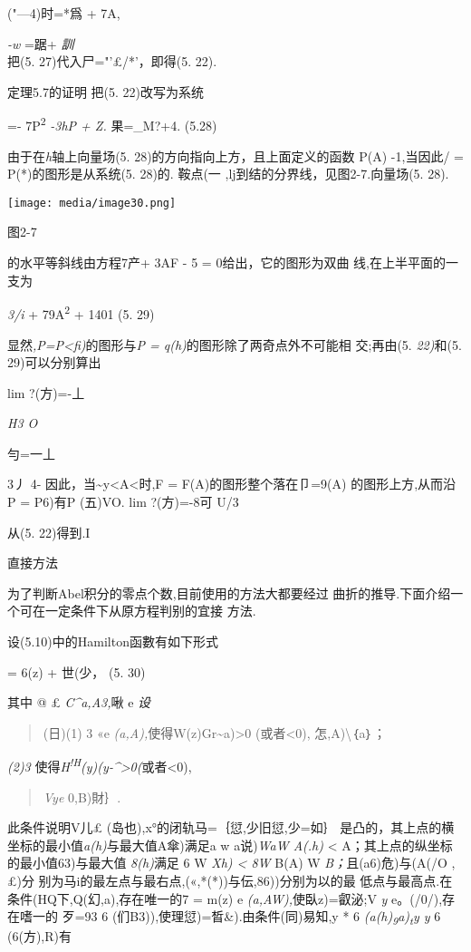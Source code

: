 \documentclass{article}
\begin{document}
("---4)时=*爲 + 7A,

\emph{-w} =踞+ \emph{訓\\
}把(5. 27)代入尸="'£/*'，即得(5. 22). \textbar{}

定理5.7的证明 把(5. 22)改写为系统

=- 7P\textsuperscript{2} \emph{-3hP + Z.} 果=\_M?+4. (5.28)

由于在\emph{h}轴上向量场(5. 28)的方向指向上方，且上面定义的函数 P(A)
-1,当因此/ = P(*)的图形是从系统(5. 28)的. 鞍点(一
\textbar{},lj到结的分界线，见图2-7.向量场(5. 28).

\texttt{[image: media/image30.png]}

图2-7

的水平等斜线由方程7产+ 3AF - 5 = 0给出，它的图形为双曲
线,在上半平面的一支为

\emph{3/i} + 79A\textsuperscript{2} + 1401 (5. 29)

显然\emph{,P=P\textless{}fi)}的图形与\emph{P =
q(h)}的图形除了两奇点外不可能相 交;再由(5. \emph{22)}和(5.
29)可以分别算出

lim ?(方)=-丄

\emph{H3 O}

勻=一丄

3丿 4- 因此，当\textasciitilde{}y\textless{}A\textless{}\textbar{}时,F =
F(A)的图形整个落在卩=9(A) 的图形上方,从而沿P = P6)有P (五)VO. lim
?(方)=-8可 U/3

从(5. 22)得到.I

直接方法

为了判断Abel积分的零点个数,目前使用的方法大都要经过
曲折的推导.下面介绍一个可在一定条件下从原方程判别的宜接 方法.

设(5.10)中的Hamilton函數有如下形式

= 6(z) + 世(少， (5. 30)

其中 @ £ \emph{C\^{}a,A3,}啾 e \emph{设}

\begin{quote}
(日)(1) 3 «e \emph{(a,A),}使得W(z)Gr\textasciitilde{}a)\textgreater{}0
(或者\textless{}0), 怎,A)\textbackslash{}｛a｝；
\end{quote}

\emph{(2)3}
使得\emph{H\textsuperscript{!H}(y)(y-\^{}\textgreater{}0(}或者\textless{}0),

\begin{quote}
\emph{Vye} 0,B)財｝.
\end{quote}

此条件说明V儿£ (岛也),x°的闭轨马=｛愆,少旧愆,少=如｝
是凸的，其上点的横坐标的最小值\emph{a(h)}与最大值A傘)满足a w
a说)\emph{WaW A(.h)} \textless{} A；其上点的纵坐标的最小值63)与最大值
\emph{8(h)}满足 6 W \emph{Xh) \textless{} 8W} B(A) W
\emph{B；}且(a6)危)与(A(/O ,£)分
别为马i的最左点与最右点,(«,*(*))与伝,86))分别为以的最
低点与最高点.在条件(HQ下,Q(幻,a),存在唯一的7 = m(z) e
\emph{(a,AW),}使臥z)=叡泌;V \emph{y} e。(/0/),存在嗜一的 歹=93 6
(们B3)),使理愆)=晳\&).由条件(同)易知,y * 6
\emph{(a(h)\textsubscript{9}a)\textsubscript{t}y y} 6 (6(方),R)有
\end{document}
